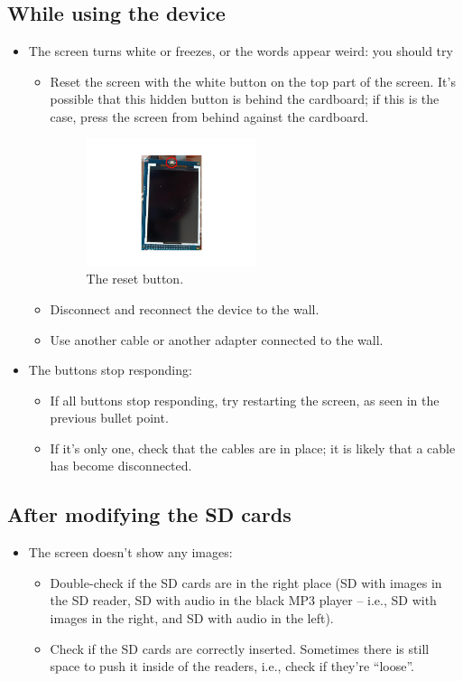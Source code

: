 \documentclass{article}
\begin{document}
\subsection{While using the device}
\begin{itemize}
    \item The screen turns white or freezes, or the words appear weird: you should try
        \begin{itemize}
            \item Reset the screen with the white button on the top part of the screen. It's possible that this hidden button is behind the cardboard; if this is the case, press the screen from behind against the cardboard.
            \begin{figure}[h]
                \centering
                \includegraphics[width=0.5\textwidth]{../images/screen_button.jpg}
                \caption{The reset button.}
            \end{figure}
            \item Disconnect and reconnect the device to the wall.
            \item Use another cable or another adapter connected to the wall.
        \end{itemize}
        \item The buttons stop responding:
        \begin{itemize}
            \item If all buttons stop responding, try restarting the screen, as seen in the previous bullet point.
            \item If it's only one, check that the cables are in place; it is likely that a cable has become disconnected.
        \end{itemize}
\end{itemize}
\subsection{After modifying the SD cards}
\begin{itemize}
    \item The screen doesn't show any images:
    \begin{itemize}
        \item Double-check if the SD cards are in the right place (SD with images in the SD reader, SD with audio in the black MP3 player -- i.e., SD with images in the right, and SD with audio in the left).
        \item Check if the SD cards are correctly inserted. Sometimes there is still space to push it inside of the readers, i.e., check if they're ``loose''.
    \end{itemize}
\end{itemize}
\end{document}

